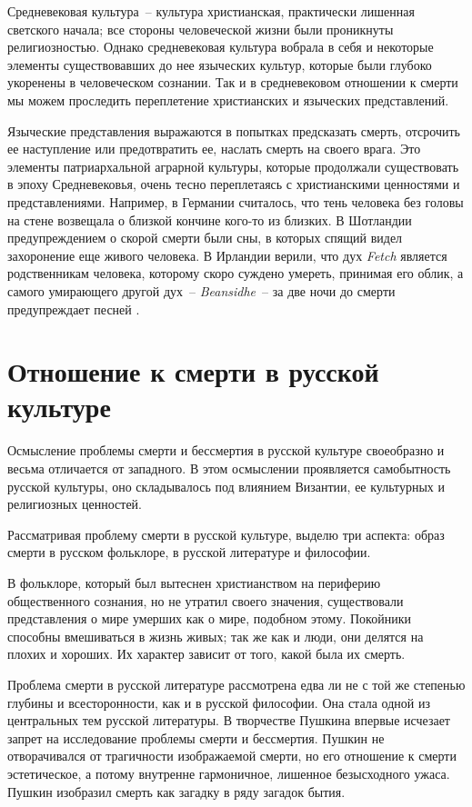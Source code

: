 \documentclass[pscyr,titlepage,chapters]{hedreport}
\begin{document}
  Средневековая культура~-- культура христианская, практически лишенная
  светского начала; все стороны человеческой жизни были проникнуты
  религиозностью. Однако средневековая культура вобрала в себя и некоторые
  элементы существовавших до нее языческих культур, которые были глубоко
  укоренены в человеческом сознании. Так и в средневековом отношении к смерти мы
  можем проследить переплетение христианских и языческих представлений.

  Языческие представления выражаются в попытках предсказать смерть, отсрочить ее
  наступление или предотвратить ее, наслать смерть на своего врага. Это элементы
  патриархальной аграрной культуры, которые продолжали существовать в эпоху
  Средневековья, очень тесно переплетаясь с христианскими ценностями и
  представлениями. Например, в Германии считалось, что тень человека без
  головы на стене возвещала о близкой кончине кого-то из близких. В Шотландии
  предупреждением о скорой смерти были сны, в которых спящий видел захоронение
  еще живого человека. В Ирландии верили, что дух \emph{Fetch} является
  родственникам человека, которому скоро суждено умереть, принимая его облик, а
  самого умирающего другой дух~-- \emph{Beansidhe}~-- за две ночи до смерти
  предупреждает песней \cite{1}.

  \chapter{Отношение к смерти в русской культуре}

  Осмысление проблемы смерти и бессмертия в русской культуре своеобразно и
  весьма отличается от западного. В этом осмыслении проявляется самобытность
  русской культуры, оно складывалось под влиянием Византии, ее культурных и
  религиозных ценностей.

  Рассматривая проблему смерти в русской культуре, выделю три аспекта: образ
  смерти в русском фольклоре, в русской литературе и философии.

  В фольклоре, который был вытеснен христианством на периферию общественного
  сознания, но не утратил своего значения, существовали представления о мире
  умерших как о мире, подобном этому. Покойники способны вмешиваться в жизнь
  живых; так же как и люди, они делятся на плохих и хороших. Их характер зависит
  от того, какой была их смерть.

  Проблема смерти в русской литературе рассмотрена едва ли не с той же степенью
  глубины и всесторонности, как и в русской философии. Она стала одной из
  центральных тем русской литературы. В творчестве Пушкина впервые исчезает
  запрет на исследование проблемы смерти и бессмертия. Пушкин не отворачивался
  от трагичности изображаемой смерти, но его отношение к смерти эстетическое, а
  потому внутренне гармоничное, лишенное безысходного ужаса. Пушкин изобразил
  смерть как загадку в ряду загадок бытия.
\end{document}
